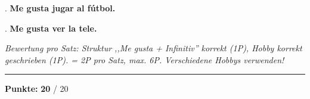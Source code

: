 \documentclass[11pt, a4paper]{article}
\newcommand{\maxpunkte}{20}
\newcommand{\loesung}[1]{\textcolor{loesung}{\textbf{#1}}}
\begin{document}
. \loesung{Me gusta jugar al fútbol.}

\vspace{0.5em}

. \loesung{Me gusta ver la tele.}

\vspace{0.5em}
\textit{\textcolor{grau}{Bewertung pro Satz: Struktur ,,Me gusta + Infinitiv'' korrekt (1P), Hobby korrekt geschrieben (1P). = 2P pro Satz, max. 6P. Verschiedene Hobbys verwenden!}}


\vspace{20pt}
\hrule
\vspace{10pt}

\begin{flushright}
\textbf{Punkte:} \loesung{\maxpunkte} / \maxpunkte
\end{flushright}
\end{document}
